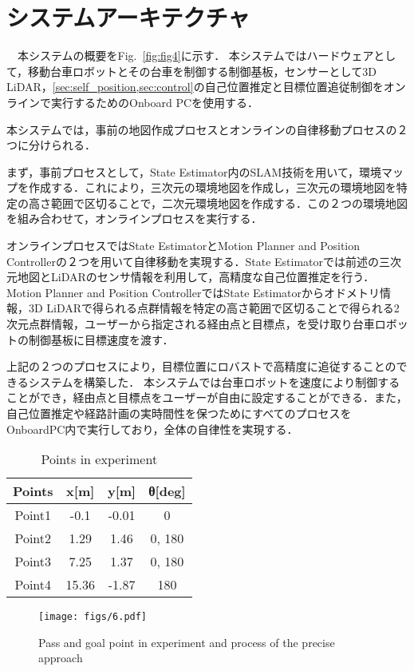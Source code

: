 \section{システムアーキテクチャ}
　本システムの概要をFig.~\ref{fig:fig4}に示す．
本システムではハードウェアとして，移動台車ロボットとその台車を制御する制御基板，センサーとして3D LiDAR，\ref{sec:self_position,sec:control}の自己位置推定と目標位置追従制御をオンラインで実行するためのOnboard PCを使用する．

本システムでは，事前の地図作成プロセスとオンラインの自律移動プロセスの２つに分けられる．

まず，事前プロセスとして，State Estimator内のSLAM技術を用いて，環境マップを作成する．これにより，三次元の環境地図を作成し，三次元の環境地図を特定の高さ範囲で区切ることで，二次元環境地図を作成する．この２つの環境地図を組み合わせて，オンラインプロセスを実行する．

オンラインプロセスではState EstimatorとMotion Planner and Position Controllerの２つを用いて自律移動を実現する．State Estimatorでは前述の三次元地図とLiDARのセンサ情報を利用して，高精度な自己位置推定を行う．Motion Planner and Position ControllerではState Estimatorからオドメトリ情報，3D LiDARで得られる点群情報を特定の高さ範囲で区切ることで得られる2次元点群情報，ユーザーから指定される経由点と目標点，を受け取り台車ロボットの制御基板に目標速度を渡す．

上記の２つのプロセスにより，目標位置にロバストで高精度に追従することのできるシステムを構築した．
本システムでは台車ロボットを速度により制御することができ，経由点と目標点をユーザーが自由に設定することができる．また，自己位置推定や経路計画の実時間性を保つためにすべてのプロセスをOnboardPC内で実行しており，全体の自律性を実現する．

\begin{table}[!t]
    \caption{Points in experiment}
    \label{table1}
    \centering
    \begin{tabular}{cccc} \hline
      Points & x[m] & y[m] & θ[deg]\\
      \hline \hline
      Point1 & -0.1 & -0.01 & 0\\
      Point2 & 1.29 & 1.46 & 0, 180\\
      Point3 & 7.25 & 1.37 & 0, 180\\
      Point4 & 15.36 & -1.87 & 180\\
      \hline
    \end{tabular}
\end{table}

\begin{figure}[!t]
\texttt{[image: figs/6.pdf]}
\caption{Pass and goal point in experiment and process of the precise approach}
\label{fig:fig6}
\end{figure}

